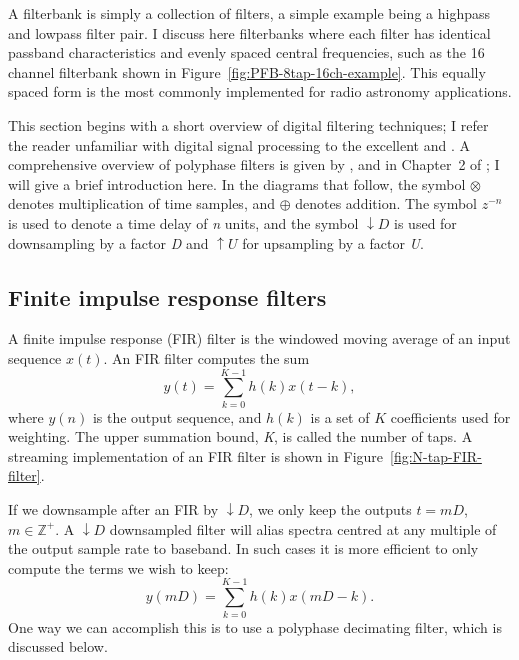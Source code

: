 \documentclass{ws-rv961x669}
\begin{document}
A filterbank is simply a collection of filters, a simple example being
a highpass and lowpass filter pair. I discuss here filterbanks where
each filter has identical passband characteristics and evenly spaced
central frequencies, such as the 16 channel filterbank shown in Figure~\ref{fig:PFB-8tap-16ch-example}.
This equally spaced form is the most commonly implemented for radio
astronomy applications. 

This section begins with a short overview of digital filtering techniques;
I refer the reader unfamiliar with digital signal processing to the
excellent \citet{bookLyonsDSP} and \citet{BookSmithDSP}. A comprehensive
overview of polyphase filters is given by \citet{Vaidyanathan:1990p6127},
and in Chapter~2 of \citet{BookHarrisMultirateDSP}; I will give
a brief introduction here. In the diagrams that follow, the symbol
$\otimes$ denotes multiplication of time samples, and $\oplus$ denotes
addition. The symbol $z^{-n}$ is used to denote a time delay of \emph{n}
units, and the symbol $\downarrow D$ is used for downsampling by
a factor \emph{D} and $\uparrow U$ for upsampling by a factor \emph{U}.



\subsection{Finite impulse response filters}

A finite impulse response (FIR) filter is the windowed moving average
of an input sequence $x(t)$. An FIR filter computes the sum 
\begin{equation}
y(t)=\sum_{k=0}^{K-1}h(k)x(t-k),\label{eq:FIR-filter}
\end{equation}
where $y(n)$ is the output sequence, and $h(k)$ is a set of $K$
coefficients used for weighting. The upper summation bound, \emph{K},
is called the number of taps.\emph{ }A streaming implementation of
an FIR filter is shown in Figure~\ref{fig:N-tap-FIR-filter}.

If we downsample after an FIR by $\downarrow D$, we only keep the
outputs $t=mD$, $m\in\mathbb{Z}^{+}$. A $\downarrow D$ downsampled
filter will alias spectra centred at any multiple of the output sample
rate to baseband. In such cases it is more efficient to only compute
the terms we wish to keep: 
\begin{equation}
y(mD)=\sum_{k=0}^{K-1}h(k)x(mD-k).\label{eq:FIR-filter-decimated}
\end{equation}
One way we can accomplish this is to use a polyphase decimating filter,
which is discussed below. 
\end{document}
